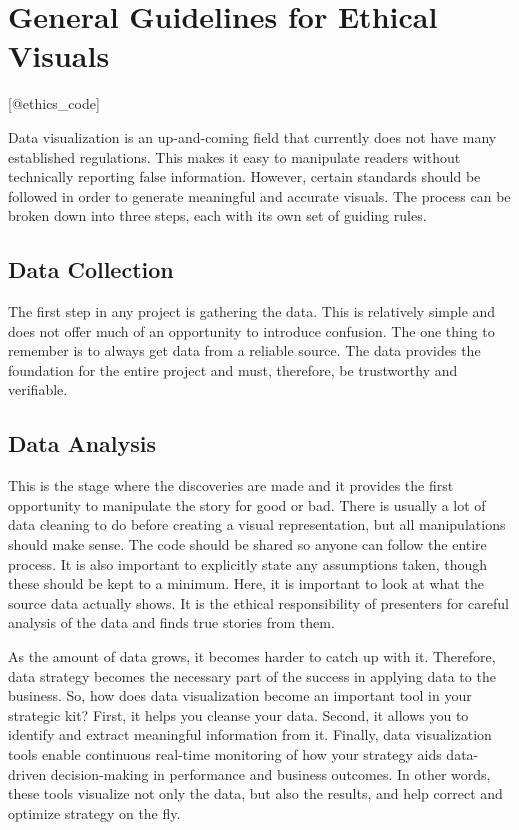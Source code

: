 \documentclass[]{book}
\theoremstyle{definition}
\theoremstyle{definition}
\theoremstyle{definition}
\theoremstyle{remark}
\begin{document}
\section{General Guidelines for Ethical
Visuals}\label{general-guidelines-for-ethical-visuals}

{[}@ethics\_code{]}

Data visualization is an up-and-coming field that currently does not
have many established regulations. This makes it easy to manipulate
readers without technically reporting false information. However,
certain standards should be followed in order to generate meaningful and
accurate visuals. The process can be broken down into three steps, each
with its own set of guiding rules.

\subsection{Data Collection}\label{data-collection}

The first step in any project is gathering the data. This is relatively
simple and does not offer much of an opportunity to introduce confusion.
The one thing to remember is to always get data from a reliable source.
The data provides the foundation for the entire project and must,
therefore, be trustworthy and verifiable.

\subsection{Data Analysis}\label{data-analysis}

This is the stage where the discoveries are made and it provides the
first opportunity to manipulate the story for good or bad. There is
usually a lot of data cleaning to do before creating a visual
representation, but all manipulations should make sense. The code should
be shared so anyone can follow the entire process. It is also important
to explicitly state any assumptions taken, though these should be kept
to a minimum. Here, it is important to look at what the source data
actually shows. It is the ethical responsibility of presenters for
careful analysis of the data and finds true stories from them.

As the amount of data grows, it becomes harder to catch up with it.
Therefore, data strategy becomes the necessary part of the success in
applying data to the business. So, how does data visualization become an
important tool in your strategic kit? First, it helps you cleanse your
data. Second, it allows you to identify and extract meaningful
information from it. Finally, data visualization tools enable continuous
real-time monitoring of how your strategy aids data-driven
decision-making in performance and business outcomes. In other words,
these tools visualize not only the data, but also the results, and help
correct and optimize strategy on the fly.
\end{document}
